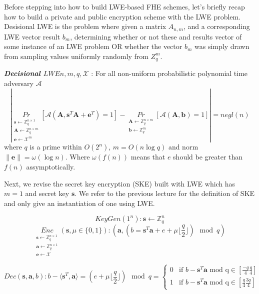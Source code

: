 \documentclass[usletter]{article}
\begin{document}
Before stepping into how to build LWE-based FHE schemes, let's briefly recap how to build a private and public encryption scheme with the LWE problem.
Desisional LWE is the problem where given a matrix $A_{n,m}$, and a corresponding LWE vector result $b_m$, determining whether or not these 
and results vector of some instance of an LWE problem OR whether the vector $b_m$ was simply 
drawn from sampling values uniformly randomly from $Z^{m}_{q}$. 
\begin{definition}
\textbf{\textit{Decisional $LWE{n,m,q,\mathcal{X}}$}} : For all non-uniform probabilistic polynomial time adversary $\mathcal{A}$
$$|\underset{\substack{
\pmb{s}\leftarrow \mathbb{Z}_q^{n\times1}\\
\pmb{A}\leftarrow\mathbb{Z}_q^{n\times m}\\
\pmb{e}\leftarrow \mathcal{X}^m}}{Pr}
[\mathcal{A}(\pmb{A},\pmb{s}^T\pmb{A}+\pmb{e}^T)=1]
-\underset{\substack{\pmb{A}\leftarrow\mathbb{Z}_q^{n\times m}\\
\pmb{b}\leftarrow\mathbb{Z}_q^m}}{Pr} 
[\mathcal{A}(\pmb{A},\pmb{b})=1]|=negl(n)$$
where $q$ is a prime within $O(2^n)$, $m=O(n\log q)$ and norm $\parallel \pmb{e}\parallel=\omega(\log n)$. Where $\omega(f(n))$ means that 
$e$ should be greater than $f(n)$ assymptotically.
\end{definition}


Next, we revise the secret key encryption (SKE) built with LWE which has $m=1$ and secret key $\pmb{s}$. We refer to the previous lecture for the definition of SKE and only give an instantiation of one using LWE.

$$KeyGen(1^n): \pmb{s}\leftarrow\mathbb{Z}_q^n$$
$$\underset{\substack{
\pmb{s}\leftarrow \mathbb{Z}_q^{n\times1}\\
\pmb{a}\leftarrow\mathbb{Z}_q^{n\times 1}\\
\pmb{e}\leftarrow \mathcal{X}}}{Enc}(\pmb{s},\mu\in\{0,1\}): (\pmb{a}, (b = \pmb{s}^T\pmb{a}+e+\mu\lfloor\frac{q}{2}\rfloor)\mod q)$$


$$Dec(\pmb{s},\pmb{a},b): b-\langle\pmb{s}^T,\pmb{a}\rangle=(e+\mu\lfloor\frac{q}{2}\rfloor) \mod q =   
  \begin{cases}
    0 & \text{if $b - \pmb{s}^T\pmb{a}$ mod q}  \in [\frac{-q}{4} \frac{q}{4} ] \\%
    1 & \text{if $b - \pmb{s}^T\pmb{a}$ mod q}  \in [\frac{q}{4} \frac{3q}{4} ]%
  \end{cases}$$
  
\end{document}
